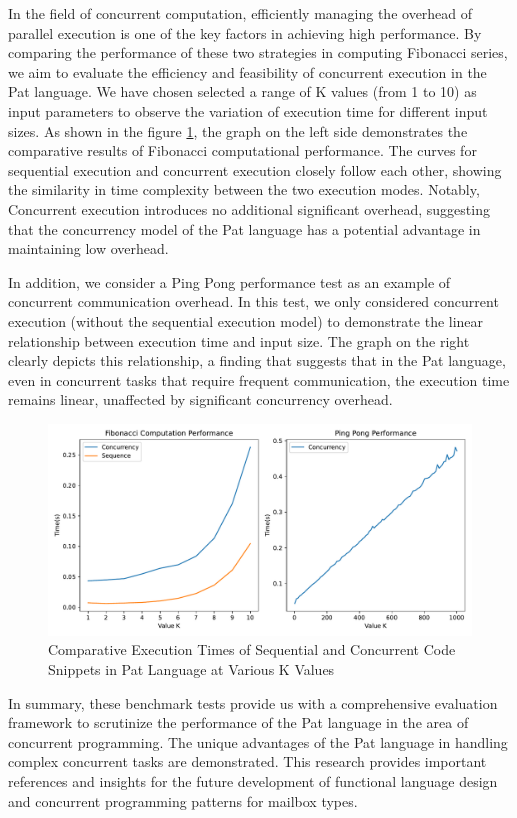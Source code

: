 \documentclass{l4proj}
\begin{document}
In the field of concurrent computation, efficiently managing the overhead of parallel execution is one of the key factors in achieving high performance. By comparing the performance of these two strategies in computing Fibonacci series, we aim to evaluate the efficiency and feasibility of concurrent execution in the Pat language. We have chosen selected a range of K values (from 1 to 10) as input parameters to observe the variation of execution time for different input sizes. As shown in the figure \ref{fig:benchmark}, the graph on the left side demonstrates the comparative results of Fibonacci computational performance. The curves for sequential execution and concurrent execution closely follow each other, showing the similarity in time complexity between the two execution modes. Notably, Concurrent execution introduces no additional significant overhead, suggesting that the concurrency model of the Pat language has a potential advantage in maintaining low overhead.

In addition, we consider a Ping Pong performance test as an example of concurrent communication overhead. In this test, we only considered concurrent execution (without the sequential execution model) to demonstrate the linear relationship between execution time and input size. The graph on the right clearly depicts this relationship, a finding that suggests that in the Pat language, even in concurrent tasks that require frequent communication, the execution time remains linear, unaffected by significant concurrency overhead.

\begin{figure}
    \centering
    \includegraphics[width=0.88\linewidth]{dissertation/images/benchmark.pdf}    
    \caption{ 
    Comparative Execution Times of Sequential and Concurrent Code Snippets in Pat Language at Various K Values
    }
    \label{fig:benchmark} 
\end{figure}

In summary, these benchmark tests provide us with a comprehensive evaluation framework to scrutinize the performance of the Pat language in the area of concurrent programming. The unique advantages of the Pat language in handling complex concurrent tasks are demonstrated. This research provides important references and insights for the future development of functional language design and concurrent programming patterns for mailbox types.
\end{document}

